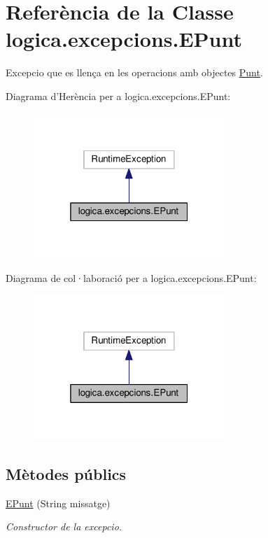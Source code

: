 \hypertarget{classlogica_1_1excepcions_1_1_e_punt}{\section{Referència de la Classe logica.\+excepcions.\+E\+Punt}
\label{classlogica_1_1excepcions_1_1_e_punt}
}


Excepcio que es llença en les operacions amb objectes \hyperlink{classlogica_1_1_punt}{Punt}.  




Diagrama d'Herència per a logica.\+excepcions.\+E\+Punt\+:
\nopagebreak
\begin{figure}[H]
\begin{center}
\leavevmode
\includegraphics[width=205pt]{classlogica_1_1excepcions_1_1_e_punt__inherit__graph}
\end{center}
\end{figure}


Diagrama de col·laboració per a logica.\+excepcions.\+E\+Punt\+:
\nopagebreak
\begin{figure}[H]
\begin{center}
\leavevmode
\includegraphics[width=205pt]{classlogica_1_1excepcions_1_1_e_punt__coll__graph}
\end{center}
\end{figure}
\subsection*{Mètodes públics}
\begin{DoxyCompactItemize}
\item 
\hyperlink{classlogica_1_1excepcions_1_1_e_punt_a7ec7da82aea156caf4614ad9d8fe3272}{E\+Punt} (String missatge)
\begin{DoxyCompactList}\small\item\em Constructor de la excepcio. \end{DoxyCompactList}\end{DoxyCompactItemize}


